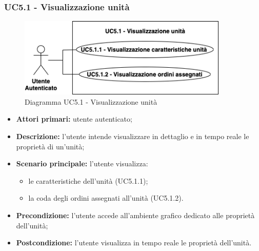     \subsubsection{UC5.1 - Visualizzazione unità}
    \begin{figure}[h!]
        \centering
        \includegraphics[width=10cm]{images/uc5.1.png}
        \caption{Diagramma UC5.1 - Visualizzazione unità}
    \end{figure}
    \begin{itemize}
        \item \textbf{Attori primari:} utente autenticato;
        \item \textbf{Descrizione:} l'utente intende visualizzare in dettaglio e in tempo reale le proprietà di un'unità;
        \item \textbf{Scenario principale:} l'utente visualizza:
        \begin{itemize}
            \item le caratteristiche dell'unità (UC5.1.1);
            \item la coda degli ordini assegnati all'unità (UC5.1.2).
        \end{itemize}
        \item \textbf{Precondizione:} l'utente accede all'ambiente grafico dedicato alle proprietà dell'unità;
        \item \textbf{Postcondizione:} l'utente visualizza in tempo reale le proprietà dell'unità.
    \end{itemize}

